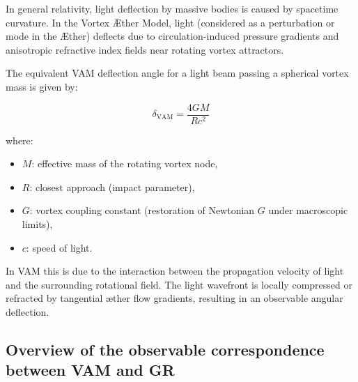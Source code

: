 In general relativity, light deflection by massive bodies is caused by spacetime curvature. In the Vortex Æther Model, light (considered as a perturbation or mode in the Æther) deflects due to circulation-induced pressure gradients and anisotropic refractive index fields near rotating vortex attractors.

The equivalent VAM deflection angle for a light beam passing a spherical vortex mass is given by:

\begin{equation}
    \delta_\text{VAM} =
    \frac{4 G M}{R c^2}
\end{equation}

where:
\begin{itemize}
    \item \( M \): effective mass of the rotating vortex node,
    \item \( R \): closest approach (impact parameter),
    \item \( G \): vortex coupling constant (restoration of Newtonian \( G \) under macroscopic limits),
    \item \( c \): speed of light.
\end{itemize}

In VAM this is due to the interaction between the propagation velocity of light and the surrounding rotational field. The light wavefront is locally compressed or refracted by tangential æther flow gradients, resulting in an observable angular deflection.

\subsection*{Overview of the observable correspondence between VAM and GR}


